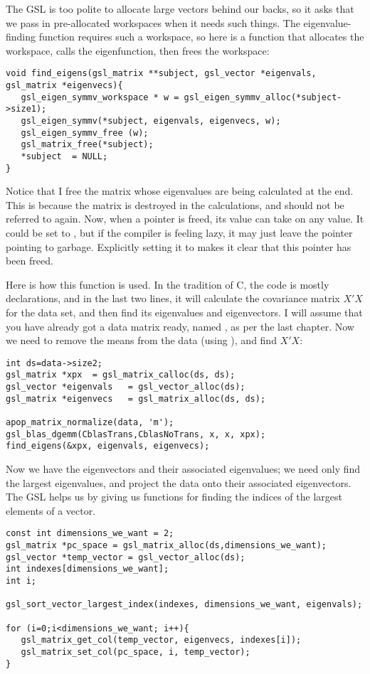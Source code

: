 The GSL is too polite to allocate large vectors behind our backs, so
it asks that we pass in pre-allocated workspaces when it needs such
things. The eigenvalue-finding function requires such a workspace, so
here is a function that allocates the workspace, calls the eigenfunction,
then frees the workspace:
\begin{lstlisting}
void find_eigens(gsl_matrix **subject, gsl_vector *eigenvals, gsl_matrix *eigenvecs){
   gsl_eigen_symmv_workspace * w = gsl_eigen_symmv_alloc(*subject->size1);
   gsl_eigen_symmv(*subject, eigenvals, eigenvecs, w);
   gsl_eigen_symmv_free (w);
   gsl_matrix_free(*subject);
   *subject  = NULL;
}
\end{lstlisting}

Notice that I free the matrix whose eigenvalues are being calculated at
the end.  This is because the matrix is destroyed in the calculations,
and should not be referred to again. Now, when a pointer is freed, its value
can take on any value. It could be set to , but if the compiler
is feeling lazy, it may just leave the pointer pointing to garbage.
Explicitly setting it to  makes it clear that this pointer has
been freed.

Here is how this function is used. In the tradition of C, the code is
mostly declarations, and in the last two lines, it will calculate the
covariance matrix $X'X$ for the data set, and then find its eigenvalues
and eigenvectors.  
I will assume that you have already got a data matrix ready, named
, as per the last chapter. Now we need to remove the means
from the data (using ), and find $X'X$:

\begin{lstlisting}
int ds=data->size2;
gsl_matrix *xpx  = gsl_matrix_calloc(ds, ds);
gsl_vector *eigenvals   = gsl_vector_alloc(ds);
gsl_matrix *eigenvecs   = gsl_matrix_alloc(ds, ds);

apop_matrix_normalize(data, 'm');
gsl_blas_dgemm(CblasTrans,CblasNoTrans, x, x, xpx);
find_eigens(&xpx, eigenvals, eigenvecs);
\end{lstlisting}

Now we have the eigenvectors and their associated eigenvalues; we need only find
the largest eigenvalues, and project the data onto their associated eigenvectors.
The GSL helps us by giving us functions for
finding the indices of the largest elements of a vector.
\begin{lstlisting}
const int dimensions_we_want = 2;
gsl_matrix *pc_space = gsl_matrix_alloc(ds,dimensions_we_want);
gsl_vector *temp_vector = gsl_vector_alloc(ds);
int indexes[dimensions_we_want];
int i;

gsl_sort_vector_largest_index(indexes, dimensions_we_want, eigenvals);

for (i=0;i<dimensions_we_want; i++){
   gsl_matrix_get_col(temp_vector, eigenvecs, indexes[i]);
   gsl_matrix_set_col(pc_space, i, temp_vector);
}
\end{lstlisting}

